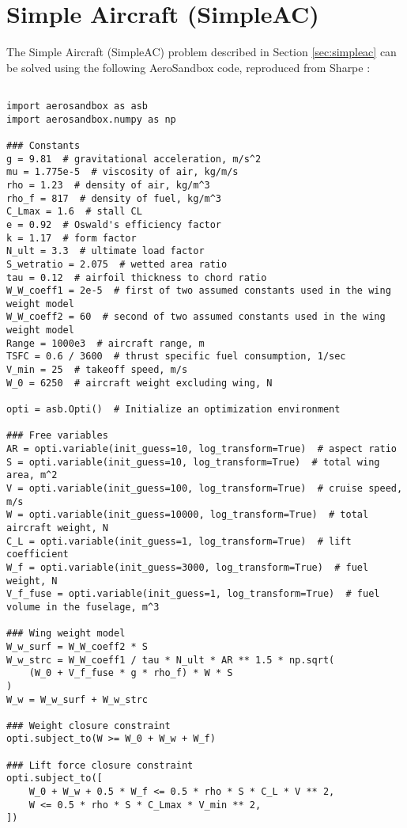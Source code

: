 \newpage
\section{Simple Aircraft (SimpleAC)}
\label{sec:simpleac-code}

The Simple Aircraft (SimpleAC) problem described in Section \ref{sec:simpleac} can be solved using the following AeroSandbox code, reproduced from Sharpe \cite{sharpe_aerosandbox_2021}:

    \begin{verbatim}

import aerosandbox as asb
import aerosandbox.numpy as np

### Constants
g = 9.81  # gravitational acceleration, m/s^2
mu = 1.775e-5  # viscosity of air, kg/m/s
rho = 1.23  # density of air, kg/m^3
rho_f = 817  # density of fuel, kg/m^3
C_Lmax = 1.6  # stall CL
e = 0.92  # Oswald's efficiency factor
k = 1.17  # form factor
N_ult = 3.3  # ultimate load factor
S_wetratio = 2.075  # wetted area ratio
tau = 0.12  # airfoil thickness to chord ratio
W_W_coeff1 = 2e-5  # first of two assumed constants used in the wing weight model
W_W_coeff2 = 60  # second of two assumed constants used in the wing weight model
Range = 1000e3  # aircraft range, m
TSFC = 0.6 / 3600  # thrust specific fuel consumption, 1/sec
V_min = 25  # takeoff speed, m/s
W_0 = 6250  # aircraft weight excluding wing, N

opti = asb.Opti()  # Initialize an optimization environment

### Free variables
AR = opti.variable(init_guess=10, log_transform=True)  # aspect ratio
S = opti.variable(init_guess=10, log_transform=True)  # total wing area, m^2
V = opti.variable(init_guess=100, log_transform=True)  # cruise speed, m/s
W = opti.variable(init_guess=10000, log_transform=True)  # total aircraft weight, N
C_L = opti.variable(init_guess=1, log_transform=True)  # lift coefficient
W_f = opti.variable(init_guess=3000, log_transform=True)  # fuel weight, N
V_f_fuse = opti.variable(init_guess=1, log_transform=True)  # fuel volume in the fuselage, m^3

### Wing weight model
W_w_surf = W_W_coeff2 * S
W_w_strc = W_W_coeff1 / tau * N_ult * AR ** 1.5 * np.sqrt(
    (W_0 + V_f_fuse * g * rho_f) * W * S
)
W_w = W_w_surf + W_w_strc

### Weight closure constraint
opti.subject_to(W >= W_0 + W_w + W_f)

### Lift force closure constraint
opti.subject_to([
    W_0 + W_w + 0.5 * W_f <= 0.5 * rho * S * C_L * V ** 2,
    W <= 0.5 * rho * S * C_Lmax * V_min ** 2,
])


\end{verbatim}

